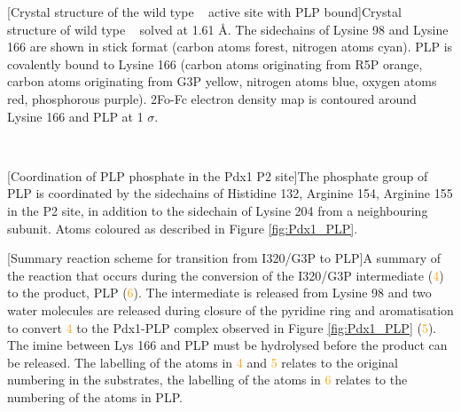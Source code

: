 \begin{minipage}{\linewidth}
	[Crystal structure of the wild type \atpdx~ active site with PLP bound]{Crystal structure of wild type \atpdx~ solved at 1.61 \si{\angstrom}. The sidechains of Lysine 98 and Lysine 166 are shown in stick format (carbon atoms forest, nitrogen atoms cyan). PLP is covalently bound to Lysine 166 (carbon atoms originating from R5P orange, carbon atoms originating from G3P yellow, nitrogen atoms blue, oxygen atoms red, phosphorous purple). 2Fo-Fc electron density map is contoured around Lysine 166 and PLP at 1 $\sigma$.\label{fig:Pdx1_PLP}} 		
\end{minipage}
\\
\begin{minipage}{\linewidth}
	[Coordination of PLP phosphate in the Pdx1 P2 site]{The phosphate group of PLP is coordinated by the sidechains of Histidine 132, Arginine 154, Arginine 155 in the P2 site, in addition to the sidechain of Lysine 204 from a neighbouring subunit. Atoms coloured as described in Figure \ref{fig:Pdx1_PLP}.\label{fig:PLP_P2}}		
\end{minipage}

\begin{minipage}{\linewidth}
	[Summary reaction scheme for transition from I320/G3P to PLP]{A summary of the reaction that occurs during the conversion of the I320/G3P intermediate (\textcolor{orange}{4}) to the product, PLP (\textcolor{orange}{6}). The intermediate is released from Lysine 98 and two water molecules are released during closure of the pyridine ring and aromatisation to convert \textcolor{orange}{4} to the Pdx1-PLP complex observed in Figure \ref{fig:Pdx1_PLP} (\textcolor{orange}{5}). The imine between Lys 166 and PLP must be hydrolysed before the product can be released. The labelling of the atoms in \textcolor{orange}{4} and \textcolor{orange}{5} relates to the original numbering in the substrates, the labelling of the atoms in \textcolor{orange}{6} relates to the numbering of the atoms in PLP.\label{fig:G3PtoPLP}}		
\end{minipage}


